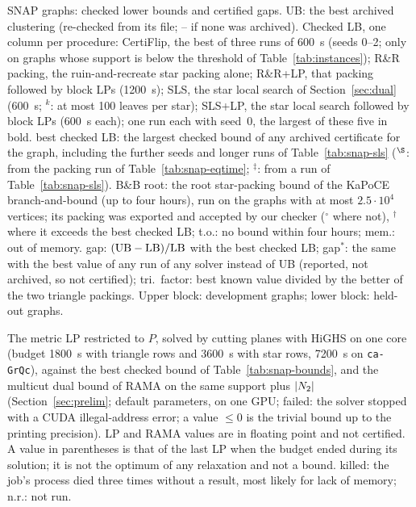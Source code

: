 \begin{table}[!tbp]
\centering
\caption{SNAP graphs: checked lower bounds and certified gaps.  UB: the
best archived clustering (re-checked from its file; -- if none was archived).
Checked LB, one column per procedure: CertiFlip, the best of three runs of
\SI{600}{s} (seeds 0--2; only on graphs whose support is below the threshold
of Table~\ref{tab:instances}); R\&R packing, the ruin-and-recreate star
packing alone; R\&R+LP, that packing followed by block LPs (\SI{1200}{s}); SLS,
the star local search of Section~\ref{sec:dual} (\SI{600}{s}; $^k$: at most
100 leaves per star); SLS+LP, the star local search followed by block LPs
(\SI{600}{s} each); one run each with seed~0, the largest of these five in
bold.  best checked LB: the largest checked bound of any archived
certificate for the graph, including the further seeds and longer runs of
Table~\ref{tab:snap-sls} ($^\S$: from the packing run of
Table~\ref{tab:snap-eqtime}; $^\ddagger$: from a run of
Table~\ref{tab:snap-sls}).  B\&B
root: the root star-packing bound of the KaPoCE branch-and-bound (up to four
hours), run on the graphs with at most $2.5\cdot10^4$ vertices; its packing
was exported and accepted by our checker ($^\circ$ where not), $^\dagger$
where it exceeds the best checked LB; t.o.: no bound within four hours;
mem.: out of memory.  gap: $(\mathrm{UB}-\LB)/\LB$ with the best checked LB;
gap$^*$: the same with the best value of any run of any solver instead of
UB (reported, not archived, so not certified); tri.\ factor: best known value
divided by the better of the two triangle packings.  Upper block:
development graphs; lower block: held-out graphs.}
\label{tab:snap-bounds}
\footnotesize
\setlength{\tabcolsep}{2.2pt}
\begin{adjustbox}{max width=\textwidth}\end{adjustbox}
\end{table}

\begin{table}[!tbp]
\centering
\caption{The metric LP restricted to $P$, solved by cutting planes with HiGHS
on one core (budget \SI{1800}{s} with triangle rows and \SI{3600}{s} with
star rows, \SI{7200}{s} on \texttt{ca-GrQc}), against the best checked bound
of Table~\ref{tab:snap-bounds}, and the multicut dual bound of RAMA on the
same support plus $|\Nt|$ (Section~\ref{sec:prelim}; default parameters, on
one GPU; failed: the solver stopped with a CUDA illegal-address error; a
value $\le0$ is the trivial bound up to the printing precision).  LP and RAMA values are in floating
point and not certified.  A value in parentheses is that of the last LP when the budget
ended during its solution; it is not the optimum of any relaxation and not a
bound.  killed: the job's process died three times without a result, most
likely for lack of memory; n.r.: not run.}
\label{tab:snap-lp}
\footnotesize
\setlength{\tabcolsep}{4pt}
\begin{adjustbox}{max width=\textwidth}\end{adjustbox}
\end{table}

